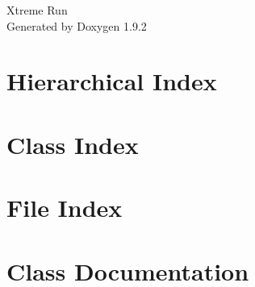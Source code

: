 \documentclass[twoside]{book}
\newcommand{\+}{\discretionary{\mbox{\scriptsize$\hookleftarrow$}}{}{}}
\newcommand{\clearemptydoublepage}{%
    \newpage{\pagestyle{empty}\cleardoublepage}%
  }
\begin{document}
  \raggedbottom
    \hypersetup{pageanchor=false,
                bookmarksnumbered=true,
                pdfencoding=unicode
               }
  \begin{titlepage}
  \vspace*{7cm}
  \begin{center}%
  {\Large Xtreme Run}\\
  \vspace*{1cm}
  {\large Generated by Doxygen 1.9.2}\\
  \end{center}
  \end{titlepage}
  \clearemptydoublepage
  \tableofcontents
  \clearemptydoublepage
  \hypersetup{pageanchor=true}
\chapter{Hierarchical Index}

\chapter{Class Index}

\chapter{File Index}

\chapter{Class Documentation}























































\end{document}
